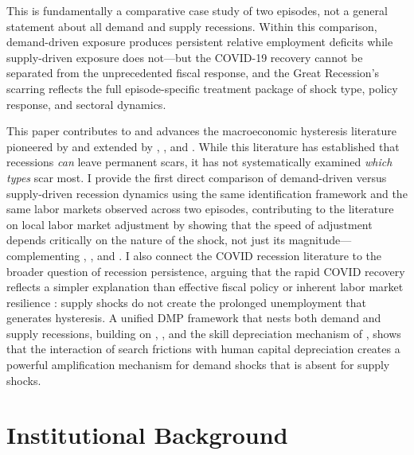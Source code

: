 \documentclass[12pt]{article}
\begin{document}
This is fundamentally a comparative case study of two episodes, not a general statement about all demand and supply recessions. Within this comparison, demand-driven exposure produces persistent relative employment deficits while supply-driven exposure does not---but the COVID-19 recovery cannot be separated from the unprecedented fiscal response, and the Great Recession's scarring reflects the full episode-specific treatment package of shock type, policy response, and sectoral dynamics.

This paper contributes to and advances the macroeconomic hysteresis literature pioneered by \citet{blanchard1986hysteresis} and extended by \citet{cerra2008growth}, \citet{jorda2013sovereigns}, and \citet{cerra2023hysteresis}. While this literature has established that recessions \textit{can} leave permanent scars, it has not systematically examined \textit{which types} scar most. I provide the first direct comparison of demand-driven versus supply-driven recession dynamics using the same identification framework and the same labor markets observed across two episodes, contributing to the literature on local labor market adjustment \citep{blanchard1992regional, autor2013china, notowidigdo2020incidence, amior2021workers, beraja2019geography} by showing that the speed of adjustment depends critically on the nature of the shock, not just its magnitude---complementing \citet{hershbein2018recessions}, \citet{dao2017regional}, and \citet{foote2021recessions}. I also connect the COVID recession literature \citep{chetty2020real, cajner2020us, forsythe2022labor} to the broader question of recession persistence, arguing that the rapid COVID recovery reflects a simpler explanation than effective fiscal policy \citep{autor2022paycheck} or inherent labor market resilience \citep{hall2021labor}: supply shocks do not create the prolonged unemployment that generates hysteresis. A unified DMP framework that nests both demand and supply recessions, building on \citet{shimer2005cyclical}, \citet{hall2005employment}, and the skill depreciation mechanism of \citet{pissarides1992loss}, shows that the interaction of search frictions with human capital depreciation creates a powerful amplification mechanism for demand shocks that is absent for supply shocks.


\section{Institutional Background}
\label{sec:background}
\end{document}
